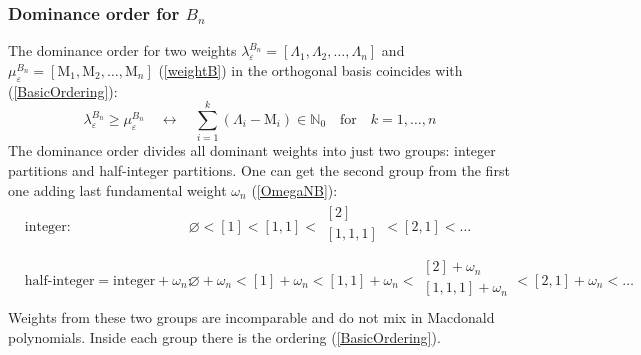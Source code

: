 \documentclass{article}
\def\ve{\varepsilon}
\begin{document}
\subsubsection{Dominance order for $B_n$}
The dominance order for two weights $ \lambda^{B_n}_{\ve} = [\Lambda_1, \Lambda_2, \dots,\Lambda_n] $ and $\mu^{B_n}_{\ve} =[\text{M}_1, \text{M}_2, \dots, \text{M}_n] $ (\ref{weightB}) in the orthogonal basis coincides with (\ref{BasicOrdering}):
\begin{equation}
    \lambda^{B_n}_{\ve}  \geq \mu^{B_n}_{\ve}   \quad \longleftrightarrow \quad \sum_{i=1}^{k} (\Lambda_i-\text{M}_i) \in \mathbb{N}_0 \quad \text{for}\quad k=1,\dots,n
\end{equation}
The dominance order divides all dominant weights into just two groups: integer partitions and half-integer partitions. One can get the second group from the first one adding last fundamental weight $\omega_n$ (\ref{OmegaNB}):
\begin{equation}
  \begin{aligned}
  & \text{integer:} %
     & & \varnothing < [1] < [1,1] <
      \begin{array}{c}
           [2] \\[0.2pt]
           [1,1,1] \\
      \end{array} < [2,1] <  \dots \\
    & \text{half-integer} =\text{integer}+\omega_n: %
     && \varnothing+\omega_n < [1]+\omega_n < [1,1] +\omega_n<
      \begin{array}{c}
           [2] +\omega_n \\[0.2pt]
           [1,1,1]+\omega_n \\
      \end{array} < [2,1]+\omega_n <  \dots
  \end{aligned}
\end{equation}
Weights from these two groups are incomparable and do not mix in Macdonald polynomials. Inside each group there is the ordering (\ref{BasicOrdering}).
\end{document}
